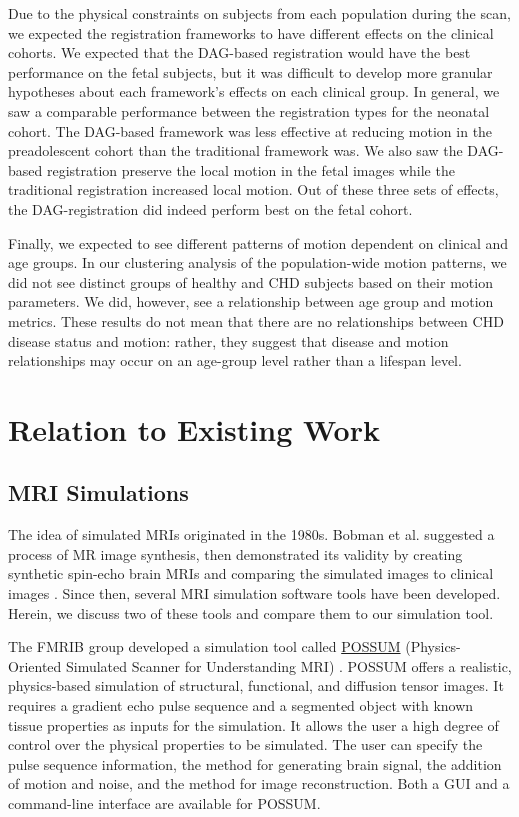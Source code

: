 Due to the physical constraints on subjects from each population during the scan, we expected the registration frameworks to have different effects on the clinical cohorts. We expected that the DAG-based registration would have the best performance on the fetal subjects, but it was difficult to develop more granular hypotheses about each framework's effects on each clinical group. In general, we saw a comparable performance between the registration types for the neonatal cohort. The DAG-based framework was less effective at reducing motion in the preadolescent cohort than the traditional framework was. We also saw the DAG-based registration preserve the local motion in the fetal images while the traditional registration increased local motion.  Out of these three sets of effects, the DAG-registration did indeed perform best on the fetal cohort. 

Finally, we expected to see different patterns of motion dependent on clinical and age groups. In our clustering analysis of the population-wide motion patterns, we did not see distinct groups of healthy and CHD subjects based on their motion parameters. We did, however, see a relationship between age group and motion metrics. These results do not mean that there are no relationships between CHD disease status and motion: rather, they suggest that disease and motion relationships may occur on an age-group level rather than a lifespan level.

\section{Relation to Existing Work}

\subsection{MRI Simulations} 

The idea of simulated MRIs originated in the 1980s. Bobman et al. suggested a process of MR image synthesis, then demonstrated its validity by creating synthetic spin-echo brain MRIs and comparing the simulated images to clinical images \cite{Bobman1985}. Since then, several MRI simulation software tools have been developed. Herein, we discuss two of these tools and compare them to our simulation tool.

The FMRIB group developed a simulation tool called \href{https://fsl.fmrib.ox.ac.uk/fsl/fslwiki/POSSUM}{POSSUM} (Physics-Oriented Simulated Scanner for Understanding MRI) \cite{Drobnjak2006} \cite{Drobnjak2010}. POSSUM offers a realistic, physics-based simulation of structural, functional, and diffusion tensor images. It requires a gradient echo pulse sequence and a segmented object with known tissue properties as inputs for the simulation. It allows the user a high degree of control over the physical properties to be simulated. The user can specify the pulse sequence information, the method for generating brain signal, the addition of motion and noise, and the method for image reconstruction. Both a GUI and a command-line interface are available for POSSUM. 


